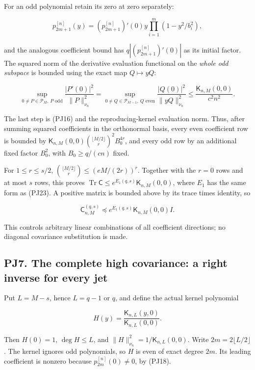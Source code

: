 \documentclass[10pt]{article}
\begin{document}
For an odd polynomial retain its zero at zero separately:

\[
p_{2m+1}^{[n]}(y)=(p_{2m+1}^{[n]})'(0)y
\prod_{i=1}^{m}(1-y^2/b_i^2),
\]

and the analogous coefficient bound has \(q|(p_{2m+1}^{[n]})'(0)|\) as its initial factor. The squared norm of the derivative evaluation functional on the \emph{whole odd subspace} is bounded using the exact map \(Q\mapsto yQ\):

\[
\sup_{0\ne P\in\mathcal P_M,\ P\text{ odd}}
\frac{|P'(0)|^2}{\|P\|_{\nu_n}^2}
=\sup_{0\ne Q\in\mathcal P_{M-1},\ Q\text{ even}}
\frac{|Q(0)|^2}{\|yQ\|_{\nu_n}^2}
\le\frac{\mathsf K_{n,M}(0,0)}{c^2n^2}.
\tag{PJ29}
\]

The last step is (PJ16) and the reproducing-kernel evaluation norm. Thus, after summing squared coefficients in the orthonormal basis, every even coefficient row is bounded by \(\mathsf K_{n,M}(0,0)\binom{\lfloor M/2\rfloor}{r}^2B_0^{4r}\), and every odd row by an additional fixed factor \(B_0^2\), with \(B_0\ge q/(cn)\) fixed.

For \(1\le r\le s/2\), \(\binom{\lfloor M/2\rfloor}{r}\le(eM/(2r))^r\). Together with the \(r=0\) rows and at most \(s\) rows, this proves \(\operatorname{Tr}\mathsf C\le e^{E_1(q,s)}\mathsf K_{n,M}(0,0)\), where \(E_1\) has the same form as (PJ23). A positive matrix is bounded above by its trace times identity, so

\[
\mathsf C_{n,M}^{(q,s)}
\preceq e^{E_1(q,s)}\mathsf K_{n,M}(0,0)I.
\tag{PJ30}
\]

This controls arbitrary linear combinations of all coefficient directions; no diagonal covariance substitution is made.

\subsection{PJ7. The complete high covariance: a right inverse for every jet}\label{pj7.-the-complete-high-covariance-a-right-inverse-for-every-jet}

Put \(L=M-s\), hence \(L=q-1\) or \(q\), and define the actual kernel polynomial

\[
H(y)=\frac{\mathsf K_{n,L}(y,0)}{\mathsf K_{n,L}(0,0)}.
\tag{PJ31}
\]

Then \(H(0)=1\), \(\deg H\le L\), and \(\|H\|_{\nu_n}^2=1/\mathsf K_{n,L}(0,0)\). Write \(2m=2\lfloor L/2\rfloor\). The kernel ignores odd polynomials, so \(H\) is even of exact degree \(2m\). Its leading coefficient is nonzero because \(p_{2m}^{[n]}(0)\ne0\), by (PJ18).
\end{document}

